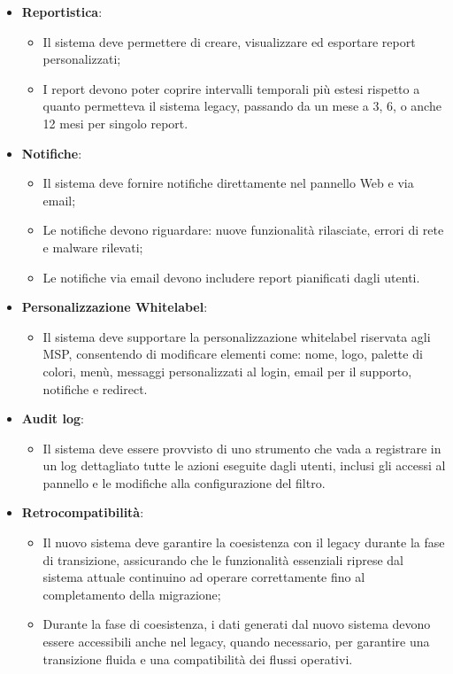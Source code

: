 \begin{itemize}
  \item \textbf{Reportistica}:
    \begin{itemize}
      \item Il sistema deve permettere di creare, visualizzare ed esportare report personalizzati;
      \item I report devono poter coprire intervalli temporali più estesi rispetto a quanto permetteva il sistema legacy, passando da un mese a 3, 6, o anche 12 mesi per singolo report.
    \end{itemize}

  \item \textbf{Notifiche}:
    \begin{itemize}
      \item Il sistema deve fornire notifiche direttamente nel pannello Web e via email;
      \item Le notifiche devono riguardare: nuove funzionalità rilasciate, errori di rete e malware rilevati;
      \item Le notifiche via email devono includere report pianificati dagli utenti.
    \end{itemize}

  \item \textbf{Personalizzazione Whitelabel}:
    \begin{itemize}
      \item Il sistema deve supportare la personalizzazione whitelabel riservata agli MSP, consentendo di modificare elementi come: nome, logo, palette di colori, menù, messaggi personalizzati al login, email per il supporto, notifiche e redirect.
    \end{itemize}

  \item \textbf{Audit log}:
    \begin{itemize}
      \item Il sistema deve essere provvisto di uno strumento che vada a registrare in un log dettagliato tutte le azioni eseguite dagli utenti, inclusi gli accessi al pannello e le modifiche alla configurazione del filtro.
    \end{itemize}

  \item \textbf{Retrocompatibilità}:
    \begin{itemize}
      \item Il nuovo sistema deve garantire la coesistenza con il legacy durante la fase di transizione, assicurando che le funzionalità essenziali riprese dal sistema attuale continuino ad operare correttamente fino al completamento della migrazione;
      \item Durante la fase di coesistenza, i dati generati dal nuovo sistema devono essere accessibili anche nel legacy, quando necessario, per garantire una transizione fluida e una compatibilità dei flussi operativi.
    \end{itemize}
\end{itemize}

